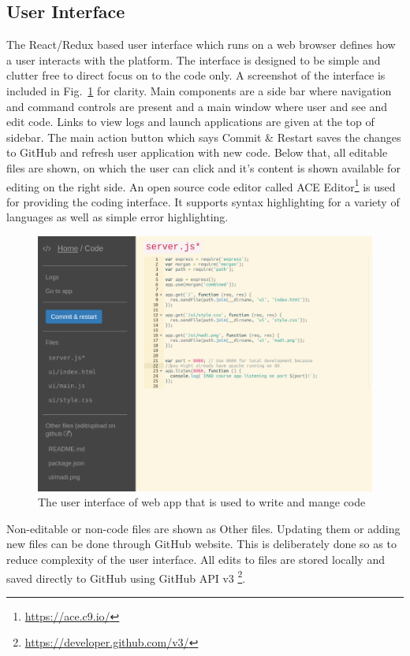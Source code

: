 \documentclass[DD]{iitmdiss}
\begin{document}
\subsection{User Interface}
The React/Redux based user interface which runs on a web browser defines how a user interacts with the platform. The interface is designed to be simple and clutter free to direct focus on to the code only. A screenshot of the interface is included in Fig.~\ref{fig:codeinterface} for clarity. Main components are a side bar where navigation and command controls are present and a main window where user and see and edit code. Links to view logs and launch applications are given at the top of sidebar. The main action button which says Commit \& Restart saves the changes to GitHub and refresh user application with new code. Below that, all editable files are shown, on which the user can click and it's content is shown available for editing on the right side. An open source code editor called ACE Editor\footnote{\url{https://ace.c9.io/}} is used for providing the coding interface. It supports syntax highlighting for a variety of languages as well as simple error highlighting.

\begin{figure}
	\centering
	\includegraphics[width=0.9\linewidth]{img/code_interface}
	\caption[User interface]{The user interface of web app that is used to write and mange code}
	\label{fig:codeinterface}
\end{figure}

Non-editable or non-code files are shown as Other files. Updating them or adding new files can be done through GitHub website. This is deliberately done so as to reduce complexity of the user interface. All edits to files are stored locally and saved directly to GitHub using GitHub API v3 \footnote{\url{https://developer.github.com/v3/}}.
\end{document}
